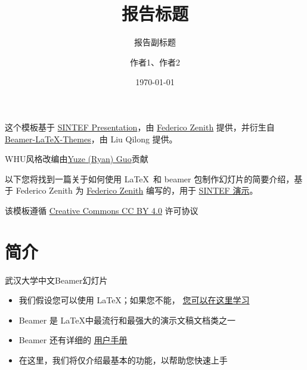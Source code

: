 \documentclass{beamer}
\title{报告标题}
\subtitle{报告副标题}
\author{作者1、作者2}
\date{\today}
\newcommand{\hrefcol}[2]{\textcolor{cyan}{\href{#1}{#2}}}
\begin{document}
\maketitle



\begin{frame}

这个模板基于 \hrefcol{https://www.overleaf.com/latex/templates/sintef-presentation/jhbhdffczpnx}{SINTEF Presentation}，由 \hrefcol{mailto:federico.zenith@sintef.no}{Federico Zenith} 提供，并衍生自 \hrefcol{https://github.com/TOB-KNPOB/Beamer-LaTeX-Themes}{Beamer-LaTeX-Themes}，由 Liu Qilong 提供。

\vspace{\baselineskip}

WHU风格改编由\hrefcol{https://ryan-gwo.github.io}{Yuze (Ryan) Guo}贡献

\vspace{\baselineskip}

以下您将找到一篇关于如何使用 \LaTeX\ 和 beamer 包制作幻灯片的简要介绍，基于 Federico Zenith 为 \hrefcol{mailto:federico.zenith@sintef.no}{Federico Zenith} 编写的，用于 \hrefcol{https://www.overleaf.com/latex/templates/sintef-presentation/jhbhdffczpnx}{SINTEF 演示}。

\vspace{\baselineskip}

该模板遵循 \hrefcol{https://creativecommons.org/licenses/by-nc/4.0/legalcode}{Creative Commons CC BY 4.0} 许可协议

\end{frame}

\section{简介}

\begin{frame}{武汉大学中文Beamer幻灯片}
\begin{itemize}
\item 我们假设您可以使用 \LaTeX；如果您不能，
\hrefcol{http://en.wikibooks.org/wiki/LaTeX/}{您可以在这里学习}
\item Beamer 是 \LaTeX 中最流行和最强大的演示文稿文档类之一
\item Beamer 还有详细的
\hrefcol{http://www.ctan.org/tex-archive/macros/latex/contrib/beamer/doc/beameruserguide.pdf}{用户手册}
\item 在这里，我们将仅介绍最基本的功能，以帮助您快速上手
\end{itemize}
\end{frame}
\end{document}
